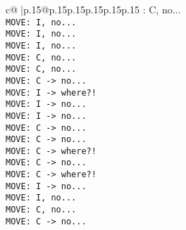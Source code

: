 \documentclass{article}
\begin{document}
{\begin{supertabular}{c@{$\;$}|p{.15\linewidth}@{}p{.15\linewidth}p{.15\linewidth}p{.15\linewidth}p{.15\linewidth}p{.15\linewidth}}
{{{: C, no...\\ \tt  MOVE: I, no...\\ \tt  MOVE: I, no...\\ \tt  MOVE: I, no...\\ \tt  MOVE: C, no...\\ \tt  MOVE: C, no...\\ \tt  MOVE: C -> no...\\ \tt  MOVE: I -> where?!\\ \tt  MOVE: I -> no...\\ \tt  MOVE: I -> no...\\ \tt  MOVE: C -> no...\\ \tt  MOVE: C -> no...\\ \tt  MOVE: C -> where?!\\ \tt  MOVE: C -> no...\\ \tt  MOVE: C -> where?!\\ \tt  MOVE: I -> no...\\ \tt  MOVE: I, no...\\ \tt  MOVE: C, no...\\ \tt  MOVE: C -> no...\\ \tt }}}
\end{supertabular}}
\end{document}
